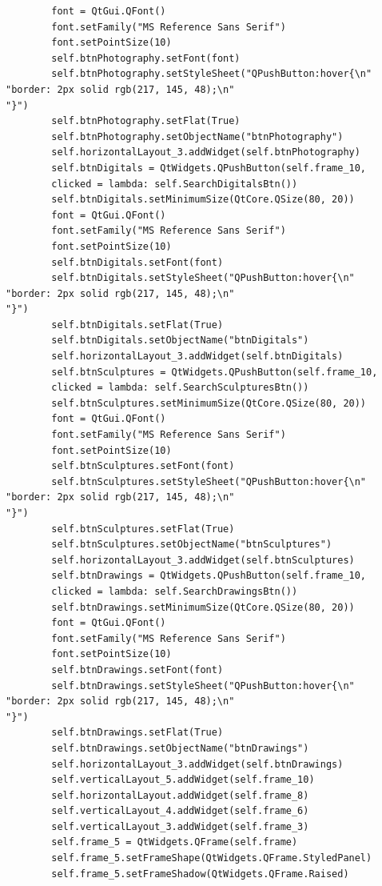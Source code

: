 \documentclass[12pt]{article}
\begin{document}
\begin{verbatim}
        font = QtGui.QFont()
        font.setFamily("MS Reference Sans Serif")
        font.setPointSize(10)
        self.btnPhotography.setFont(font)
        self.btnPhotography.setStyleSheet("QPushButton:hover{\n"
"border: 2px solid rgb(217, 145, 48);\n"
"}")
        self.btnPhotography.setFlat(True)
        self.btnPhotography.setObjectName("btnPhotography")
        self.horizontalLayout_3.addWidget(self.btnPhotography)
        self.btnDigitals = QtWidgets.QPushButton(self.frame_10, 
        clicked = lambda: self.SearchDigitalsBtn())
        self.btnDigitals.setMinimumSize(QtCore.QSize(80, 20))
        font = QtGui.QFont()
        font.setFamily("MS Reference Sans Serif")
        font.setPointSize(10)
        self.btnDigitals.setFont(font)
        self.btnDigitals.setStyleSheet("QPushButton:hover{\n"
"border: 2px solid rgb(217, 145, 48);\n"
"}")
        self.btnDigitals.setFlat(True)
        self.btnDigitals.setObjectName("btnDigitals")
        self.horizontalLayout_3.addWidget(self.btnDigitals)
        self.btnSculptures = QtWidgets.QPushButton(self.frame_10,
        clicked = lambda: self.SearchSculpturesBtn())
        self.btnSculptures.setMinimumSize(QtCore.QSize(80, 20))
        font = QtGui.QFont()
        font.setFamily("MS Reference Sans Serif")
        font.setPointSize(10)
        self.btnSculptures.setFont(font)
        self.btnSculptures.setStyleSheet("QPushButton:hover{\n"
"border: 2px solid rgb(217, 145, 48);\n"
"}")
        self.btnSculptures.setFlat(True)
        self.btnSculptures.setObjectName("btnSculptures")
        self.horizontalLayout_3.addWidget(self.btnSculptures)
        self.btnDrawings = QtWidgets.QPushButton(self.frame_10, 
        clicked = lambda: self.SearchDrawingsBtn())
        self.btnDrawings.setMinimumSize(QtCore.QSize(80, 20))
        font = QtGui.QFont()
        font.setFamily("MS Reference Sans Serif")
        font.setPointSize(10)
        self.btnDrawings.setFont(font)
        self.btnDrawings.setStyleSheet("QPushButton:hover{\n"
"border: 2px solid rgb(217, 145, 48);\n"
"}")
        self.btnDrawings.setFlat(True)
        self.btnDrawings.setObjectName("btnDrawings")
        self.horizontalLayout_3.addWidget(self.btnDrawings)
        self.verticalLayout_5.addWidget(self.frame_10)
        self.horizontalLayout.addWidget(self.frame_8)
        self.verticalLayout_4.addWidget(self.frame_6)
        self.verticalLayout_3.addWidget(self.frame_3)
        self.frame_5 = QtWidgets.QFrame(self.frame)
        self.frame_5.setFrameShape(QtWidgets.QFrame.StyledPanel)
        self.frame_5.setFrameShadow(QtWidgets.QFrame.Raised)

\end{verbatim}
\end{document}
